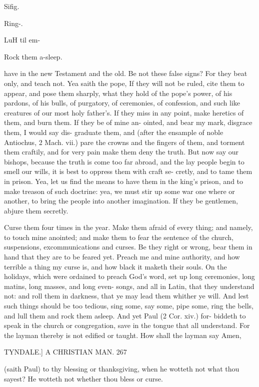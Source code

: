 \documentclass{custom}
\begin{document}
{Sifig. 

Ring-. 

LuH til em- 

Rock them 
a-sleep. 

have in the new Testament and the old. Be not these 
false signs? For they beat only, and teach not. Yea 
saith the pope, If they will not be ruled, cite them to 
appear, and pose them sharply, what they hold of the 
pope's power, of his pardons, of his bulls, of purgatory, 
of ceremonies, of confession, and such like creatures of 
our most holy father's. If they miss in any point, make 
heretics of them, and burn them. If they be of mine an- 
ointed, and bear my mark, disgrace them, I would say dis- 
graduate them, and (after the ensample of noble Antiochus, 
2 Mach. vii.) pare the crowns and the fingers of them, 
and torment them craftily, and for very pain make them 
deny the truth. But now say our bishops, because the 
truth is come too far abroad, and the lay people begin to 
smell our wills, it is best to oppress them with craft se- 
cretly, and to tame them in prison. Yea, let us find the 
means to have them in the king's prison, and to make 
treason of such doctrine: yea, we must stir up some war 
one where or another, to bring the people into another 
imagination. If they be gentlemen, abjure them secretly. 

Curse them four times in the year. Make them afraid 
of every thing; and namely, to touch mine anointed; and 
make them to fear the sentence of the church, suspensions, 
excommunications and curses. Be they right or wrong, 
bear them in hand that they are to be feared yet. Preach 
me and mine authority, and how terrible a thing my curse 
is, and how black it maketh their souls. On the holidays, 
which were ordained to preach God's word, set up long 
ceremonies, long matins, long masses, and long even- 
songs, and all in Latin, that they understand not: and 
roll them in darkness, that ye may lead them whither 
ye will. And lest such things should be too tedious, sing 
some, say some, pipe some, ring the bells, and lull them 
and rock them asleep. And yet Paul (2 Cor. xiv.) for- 
biddeth to speak in the church or congregation, save in 
the tongue that all understand. For the layman thereby 
is not edified or taught. How shall the layman say Amen, 


TYNDALE.]
A CHRISTIAN MAN.
267

(saith Paul) to thy blessing or thanksgiving, when he 
wotteth not what thou sayest? He wotteth not whether 
thou bless or curse. 

}
\end{document}
